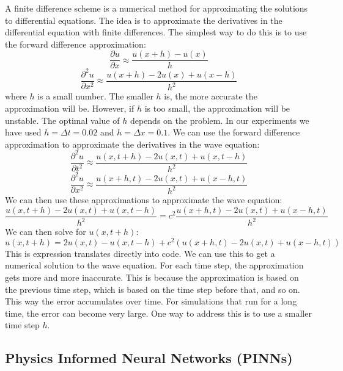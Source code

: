 \documentclass[twoside,11pt]{report}
\begin{document}
    A finite difference scheme is a numerical method for approximating the solutions to differential equations.
    The idea is to approximate the derivatives in the differential equation with finite differences.
    The simplest way to do this is to use the forward difference approximation:
    \begin{equation}
    \frac{\partial u}{\partial x} \approx \frac{u(x+h) - u(x)}{h}
    \end{equation}
    \begin{equation}
    \frac{\partial^2 u}{\partial x^2} \approx \frac{u(x+h) - 2u(x) + u(x-h)}{h^2}
    \end{equation}
    where $h$ is a small number. The smaller $h$ is, the more accurate the approximation will be.
    However, if $h$ is too small, the approximation will be unstable. The optimal value of $h$ depends
    on the problem. In our experiments we have used $h=\Delta t=0.02$ and $h=\Delta x=0.1$.
    We can use the forward difference approximation to approximate the derivatives in the wave equation:
    \begin{equation}
    \frac{\partial^2 u}{\partial t^2} \approx \frac{u(x,t+h) - 2u(x,t) + u(x,t-h)}{h^2}
    \end{equation}
    \begin{equation}
    \frac{\partial^2 u}{\partial x^2} \approx \frac{u(x+h,t) - 2u(x,t) + u(x-h,t)}{h^2}
    \end{equation}
    We can then use these approximations to approximate the wave equation:
    \begin{equation}
    \frac{u(x,t+h) - 2u(x,t) + u(x,t-h)}{h^2} = c^2 \frac{u(x+h,t) - 2u(x,t) + u(x-h,t)}{h^2}
    \end{equation}
    We can then solve for $u(x,t+h)$:
    \begin{equation}
    u(x,t+h) = 2u(x,t) - u(x,t-h) + c^2(u(x+h,t) - 2u(x,t) + u(x-h,t))
    \end{equation}
    This is expression translates directly into code. We can use this to get a numerical solution to the wave equation.
    For each time step, the approximation gets more and more inaccurate. This is because the approximation is based on
    the previous time step, which is based on the time step before that, and so on. This way the error accumulates
    over time. For simulations that run for a long time, the error can become very large. One way to address this
    is to use a smaller time step $h$.


\subsection{Physics Informed Neural Networks (PINNs)}
\label{sec:DNN}
    
\end{document}
